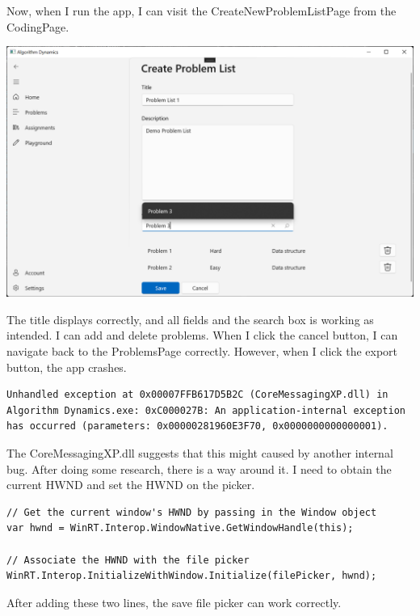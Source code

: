 \documentclass[a4paper]{report}
\begin{document}
Now, when I run the app, I can visit the CreateNewProblemListPage from the CodingPage.

\includegraphics[width=\textwidth, height=\textheight, keepaspectratio]{CreateNewProblemListPage-CreateList}

The title displays correctly, and all fields and the search box is working as intended. I can add and delete problems. When I click the cancel button, I can navigate back to the ProblemsPage correctly. However, when I click the export button, the app crashes.

\begin{verbatim}
Unhandled exception at 0x00007FFB617D5B2C (CoreMessagingXP.dll) in Algorithm Dynamics.exe: 0xC000027B: An application-internal exception has occurred (parameters: 0x00000281960E3F70, 0x0000000000000001).
\end{verbatim}

The CoreMessagingXP.dll suggests that this might caused by another internal bug. After doing some research, there is a way around it. I need to obtain the current HWND and set the HWND on the picker\cite{github:WindowsAppSDK:1188}.

\begin{verbatim}
// Get the current window's HWND by passing in the Window object
var hwnd = WinRT.Interop.WindowNative.GetWindowHandle(this);

// Associate the HWND with the file picker
WinRT.Interop.InitializeWithWindow.Initialize(filePicker, hwnd);
\end{verbatim}

After adding these two lines, the save file picker can work correctly.
\end{document}
